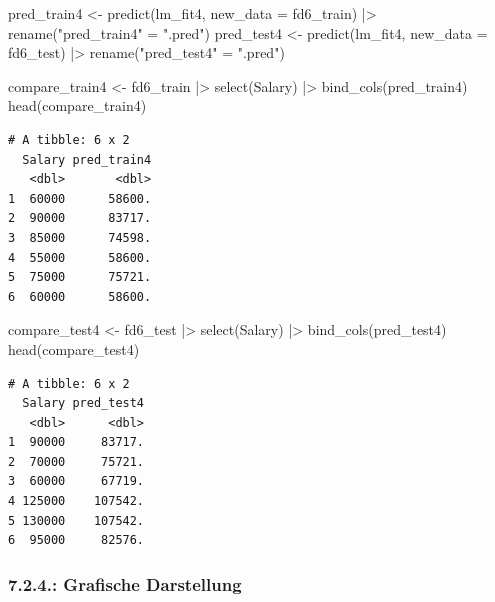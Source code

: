 \documentclass[
  letterpaper,
  DIV=11,
  numbers=noendperiod]{scrartcl}
\newenvironment{Shaded}{\begin{snugshade}}{\end{snugshade}}
\newcommand{\AttributeTok}[1]{\textcolor[rgb]{0.40,0.45,0.13}{#1}}
\newcommand{\FunctionTok}[1]{\textcolor[rgb]{0.28,0.35,0.67}{#1}}
\newcommand{\NormalTok}[1]{\textcolor[rgb]{0.00,0.23,0.31}{#1}}
\newcommand{\OtherTok}[1]{\textcolor[rgb]{0.00,0.23,0.31}{#1}}
\newcommand{\SpecialCharTok}[1]{\textcolor[rgb]{0.37,0.37,0.37}{#1}}
\newcommand{\StringTok}[1]{\textcolor[rgb]{0.13,0.47,0.30}{#1}}
\begin{document}
\begin{Shaded}
\begin{Highlighting}[]
\NormalTok{pred\_train4 }\OtherTok{\textless{}{-}} \FunctionTok{predict}\NormalTok{(lm\_fit4, }\AttributeTok{new\_data =}\NormalTok{ fd6\_train) }\SpecialCharTok{|\textgreater{}} \FunctionTok{rename}\NormalTok{(}\StringTok{"pred\_train4"} \OtherTok{=} \StringTok{".pred"}\NormalTok{)}
\NormalTok{pred\_test4 }\OtherTok{\textless{}{-}} \FunctionTok{predict}\NormalTok{(lm\_fit4, }\AttributeTok{new\_data =}\NormalTok{ fd6\_test) }\SpecialCharTok{|\textgreater{}}  \FunctionTok{rename}\NormalTok{(}\StringTok{"pred\_test4"} \OtherTok{=} \StringTok{".pred"}\NormalTok{)}

\NormalTok{compare\_train4 }\OtherTok{\textless{}{-}}\NormalTok{ fd6\_train }\SpecialCharTok{|\textgreater{}} 
  \FunctionTok{select}\NormalTok{(Salary) }\SpecialCharTok{|\textgreater{}} 
  \FunctionTok{bind\_cols}\NormalTok{(pred\_train4)}
\FunctionTok{head}\NormalTok{(compare\_train4)}
\end{Highlighting}
\end{Shaded}

\begin{verbatim}
# A tibble: 6 x 2
  Salary pred_train4
   <dbl>       <dbl>
1  60000      58600.
2  90000      83717.
3  85000      74598.
4  55000      58600.
5  75000      75721.
6  60000      58600.
\end{verbatim}

\begin{Shaded}
\begin{Highlighting}[]
\NormalTok{compare\_test4 }\OtherTok{\textless{}{-}}\NormalTok{ fd6\_test }\SpecialCharTok{|\textgreater{}} 
  \FunctionTok{select}\NormalTok{(Salary) }\SpecialCharTok{|\textgreater{}} 
  \FunctionTok{bind\_cols}\NormalTok{(pred\_test4)}
\FunctionTok{head}\NormalTok{(compare\_test4)}
\end{Highlighting}
\end{Shaded}

\begin{verbatim}
# A tibble: 6 x 2
  Salary pred_test4
   <dbl>      <dbl>
1  90000     83717.
2  70000     75721.
3  60000     67719.
4 125000    107542.
5 130000    107542.
6  95000     82576.
\end{verbatim}

\hypertarget{grafische-darstellung-1}{%
\subsubsection{7.2.4.: Grafische
Darstellung}\label{grafische-darstellung-1}}
\end{document}
